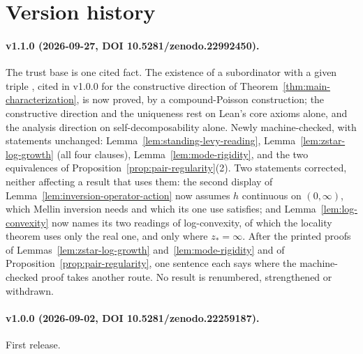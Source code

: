 
\section*{Version history}

\paragraph{v1.1.0 (2026-09-27, DOI 10.5281/zenodo.22992450).}
The trust base is one cited fact. The existence of a subordinator with a given triple
\cite[Thm.~5.2]{schilling2012bernstein}, cited in v1.0.0 for the constructive direction of
Theorem~\ref{thm:main-characterization}, is now proved, by a compound-Poisson construction; the
constructive direction and the uniqueness rest on Lean's core axioms alone, and the analysis
direction on self-decomposability \cite[Prop.~5.17]{schilling2012bernstein} alone. Newly
machine-checked, with statements unchanged: Lemma~\ref{lem:standing-levy-reading},
Lemma~\ref{lem:zstar-log-growth} (all four clauses), Lemma~\ref{lem:mode-rigidity}, and the two
equivalences of Proposition~\ref{prop:pair-regularity}(2). Two statements corrected, neither
affecting a result that uses them: the second display of Lemma~\ref{lem:inversion-operator-action}
now assumes $h$ continuous on $(0,\infty)$, which Mellin inversion needs and which its one use
satisfies; and Lemma~\ref{lem:log-convexity} now names its two readings of log-convexity, of which
the locality theorem uses only the real one, and only where $z_* = \infty$. After the printed proofs
of Lemmas~\ref{lem:zstar-log-growth} and~\ref{lem:mode-rigidity} and of
Proposition~\ref{prop:pair-regularity}, one sentence each says where the machine-checked proof
takes another route. No result is renumbered, strengthened or withdrawn.

\paragraph{v1.0.0 (2026-09-02, DOI 10.5281/zenodo.22259187).}
First release.
